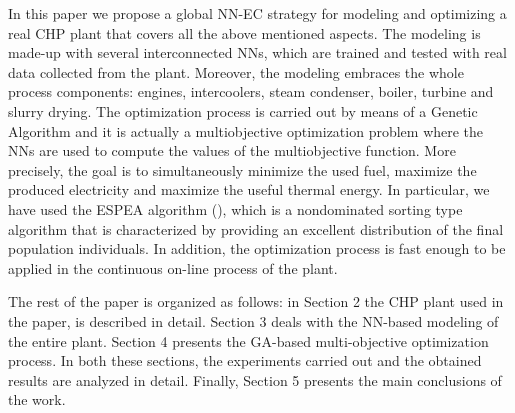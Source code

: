 \bigskip
\par
In this paper we propose a global NN-EC strategy for modeling and optimizing a real CHP plant that covers all the above mentioned aspects. The modeling is made-up with several interconnected NNs, which are trained and tested with real data collected from the plant. Moreover, the modeling embraces the whole process components: engines, intercoolers, steam condenser, boiler, turbine and slurry drying. The optimization process is carried out by means of a Genetic Algorithm and it is actually a multiobjective optimization problem where the NNs are used to compute the values of the multiobjective function. More precisely, the goal is to simultaneously minimize the used fuel, maximize the produced electricity and maximize the useful thermal energy. In particular, we have used the ESPEA algorithm (\cite{espea}), which is a nondominated sorting type algorithm that is characterized by providing an excellent distribution of the final population individuals. In addition, the optimization process is fast enough to be applied in the continuous on-line process of the plant.  
\bigskip
\par
The rest of the paper is organized as follows: in Section 2 the CHP plant used in the paper, is described in detail. Section 3 deals with the NN-based modeling of the entire plant. Section 4 presents the GA-based multi-objective optimization process. In both these sections, the experiments carried out and the obtained results are analyzed in detail. Finally, Section 5 presents the main conclusions of the work.